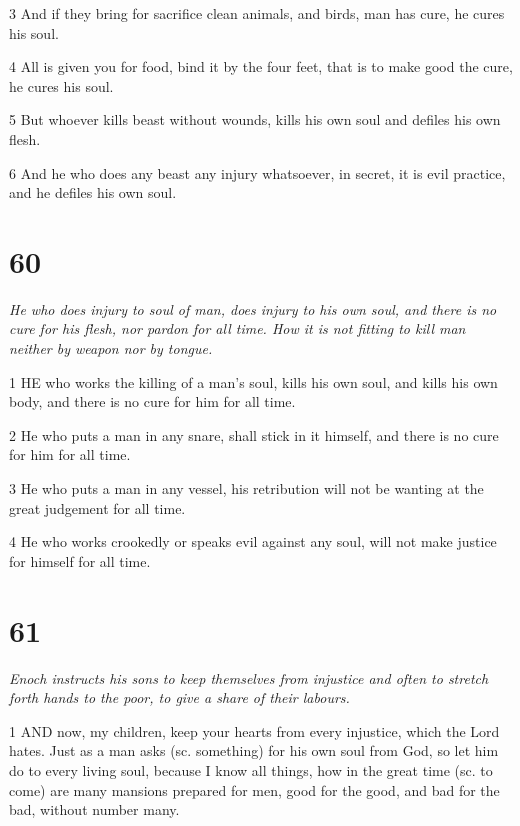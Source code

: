 \par 3 And if they bring for sacrifice clean animals, and birds, man has cure, he cures his soul.

\par 4 All is given you for food, bind it by the four feet, that is to make good the cure, he cures his soul.

\par 5 But whoever kills beast without wounds, kills his own soul and defiles his own flesh.

\par 6 And he who does any beast any injury whatsoever, in secret, it is evil practice, and he defiles his own soul.

\chapter{60}

\par \textit{He who does injury to soul of man, does injury to his own soul, and there is no cure for his flesh, nor pardon for all time. How it is not fitting to kill man neither by weapon nor by tongue.}

\par 1 HE who works the killing of a man's soul, kills his own soul, and kills his own body, and there is no cure for him for all time.

\par 2 He who puts a man in any snare, shall stick in it himself, and there is no cure for him for all time.

\par 3 He who puts a man in any vessel, his retribution will not be wanting at the great judgement for all time.

\par 4 He who works crookedly or speaks evil against any soul, will not make justice for himself for all time.

\chapter{61}

\par \textit{Enoch instructs his sons to keep themselves from injustice and often to stretch forth hands to the poor, to give a share of their labours.}

\par 1 AND now, my children, keep your hearts from every injustice, which the Lord hates. Just as a man asks (sc. something) for his own soul from God, so let him do to every living soul, because I know all things, how in the great time (sc. to come) are many mansions prepared for men, good for the good, and bad for the bad, without number many.


